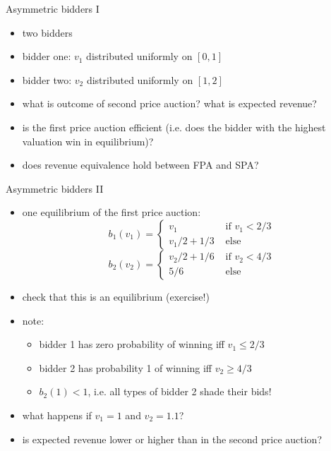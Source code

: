\documentclass[bigger]{beamer}
\begin{document}
\begin{frame}[label={sec:orgc6d206f}]{Asymmetric bidders I}
\begin{itemize}
\item two bidders
\item bidder one: \(v_1\) distributed uniformly on \([0,1]\)
\item bidder two: \(v_2\) distributed uniformly on \([1,2]\)
\item what is outcome of second price auction? what is expected revenue?
\end{itemize}
\vspace*{0.3cm}
\begin{itemize}
\item is the first price auction efficient (i.e. does the bidder with the highest valuation win in equilibrium)?
\item does revenue equivalence hold between FPA and SPA?
\end{itemize}
\end{frame}
\begin{frame}[label={sec:org830a9f3}]{Asymmetric bidders II}
\begin{itemize}
\item one equilibrium of the first price auction:
$$b_1(v_1)=\begin{cases}v_1 & \text{ if }v_1<2/3\\v_1/2+1/3& \text{ else }\end{cases}$$
$$b_2(v_2)=\begin{cases}v_2/2+1/6 & \text{ if }v_2<4/3\\ 5/6& \text{ else }\end{cases}$$
\item check that this is an equilibrium (exercise!)
\item note:
\begin{itemize}
\item bidder 1 has zero probability of winning iff \(v_1\leq 2/3\)
\item bidder 2 has probability 1 of winning iff \(v_2\geq 4/3\)
\item \(b_2(1)<1\), i.e. all types of bidder 2 shade their bids!
\end{itemize}
\item what happens if \(v_1=1\) and \(v_2=1.1\)?
\item is expected revenue lower or higher than in the second price auction?
\end{itemize}
\end{frame}
\end{document}
